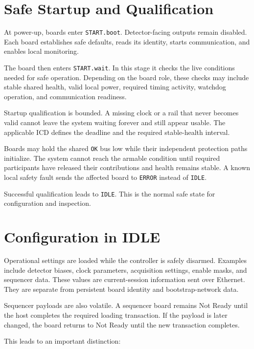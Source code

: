 \section{Safe Startup and Qualification}

At power-up, boards enter \texttt{START.boot}. Detector-facing outputs remain disabled. Each board establishes safe defaults, reads its identity, starts communication, and enables local monitoring.

The board then enters \texttt{START.wait}. In this stage it checks the live conditions needed for safe operation. Depending on the board role, these checks may include stable shared health, valid local power, required timing activity, watchdog operation, and communication readiness.

Startup qualification is bounded. A missing clock or a rail that never becomes valid cannot leave the system waiting forever and still appear usable. The applicable ICD defines the deadline and the required stable-health interval.

Boards may hold the shared \texttt{OK} bus low while their independent protection paths initialize. The system cannot reach the armable condition until required participants have released their contributions and health remains stable. A known local safety fault sends the affected board to \texttt{ERROR} instead of \texttt{IDLE}.

Successful qualification leads to \texttt{IDLE}. This is the normal safe state for configuration and inspection.

\section{Configuration in IDLE}

Operational settings are loaded while the controller is safely disarmed. Examples include detector biases, clock parameters, acquisition settings, enable masks, and sequencer data. These values are current-session information sent over Ethernet. They are separate from persistent board identity and bootstrap-network data.

Sequencer payloads are also volatile. A sequencer board remains Not Ready until the host completes the required loading transaction. If the payload is later changed, the board returns to Not Ready until the new transaction completes.

This leads to an important distinction:

